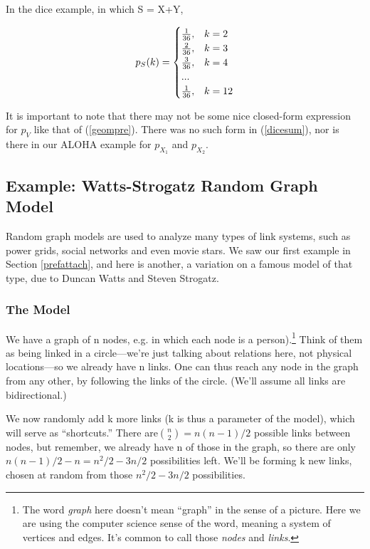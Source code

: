 In the dice example, in which S = X+Y,

\begin{equation}
\label{dicesum}
p_S(k) = 
\begin{cases}
\frac{1}{36}, & k = 2 \cr
\frac{2}{36}, & k = 3 \cr
\frac{3}{36}, & k = 4 \cr
... \cr
\frac{1}{36}, & k = 12
\end{cases}
\end{equation}

It is important to note that there may not be some nice closed-form
expression for $p_V$ like that of (\ref{geompre}).  There was no such
form in (\ref{dicesum}), nor is there in our ALOHA example for
$p_{X_1}$ and $p_{X_2}$.

\subsection{Example:  Watts-Strogatz Random Graph Model}
\label{strogatz}

Random graph models are used to analyze many types of link systems, such
as power grids, social networks and even movie stars.  We saw our first
example in Section \ref{prefattach}, and here is another, a variation on
a famous model of that type, due to Duncan Watts and Steven Strogatz.

\subsubsection{The Model} 

We have a graph of n nodes, e.g. in which each node is a person).\footnote{The
word {\it graph} here doesn't mean ``graph'' in the sense of a picture.
Here we are using the computer science sense of the word, meaning a
system of vertices and edges.  It's common to call those {\it nodes} and
{\it links}.} Think of them as being linked in a circle---we're just
talking about relations here, not physical locations---so we already
have n links.  One can thus reach any node in the graph from any other,
by following the links of the circle.  (We'll assume all links are
bidirectional.)

We now randomly add k more links (k is thus a parameter of the model),
which will serve as ``shortcuts.''  There are$\binom{n}{2} = n(n-1)/2$
possible links between nodes, but remember, we already have n of those
in the graph, so there are only $n(n-1)/2 - n = n^2/2 - 3n/2$
possibilities left.  We'll be forming k new links, chosen at random from
those $n^2/2 - 3n/2$ possibilities.

